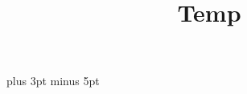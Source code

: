 \documentclass[a5paper,twoside]{article}
\title{Temp}
\begin{document}

  \versesep=12pt plus 3pt minus 5pt

  \begin{songs}{}
    
    
    
    
  \end{songs}
\end{document}
